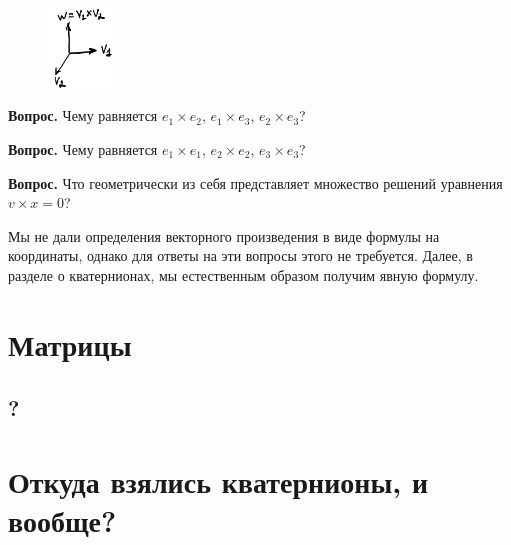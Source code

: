 \documentclass[a4paper,12pt]{article}
\newcounter{th-counter}
\begin{document}
\begin{figure}[H] %
    \centering
    \includegraphics[width=0.15\textwidth]{pictures/pct_cross_product.jpg}
\end{figure}

\noindent\textbf{Вопрос.} Чему равняется $e_1 \times e_2$, $e_1 \times e_3$, $e_2 \times e_3$?

\noindent\textbf{Вопрос.} Чему равняется $e_1 \times e_1$, $e_2 \times e_2$, $e_3 \times e_3$?

\noindent\textbf{Вопрос.} Что геометрически из себя представляет множество решений уравнения $v \times x = 0$?

Мы не дали определения векторного произведения в виде формулы на координаты, однако для ответы на эти вопросы этого не требуется. Далее, в разделе о кватернионах, мы естественным образом получим явную формулу.

\section*{Матрицы}
\subsection*{?}

\section*{Откуда взялись кватернионы, и вообще?}



\newpage
\nocite{*}
\printbibliography[nottype=unpublished]
\end{document}
